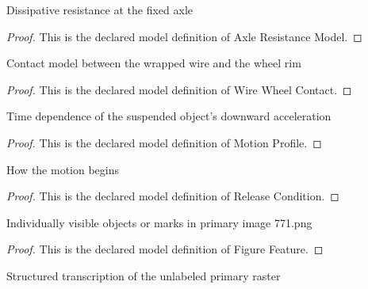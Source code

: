 \begin{definition}
  \label{def:physics:phyx-mini-0771:phyxminiproblems-problemphyxmini0771-axleresistancemodel}
  Dissipative resistance at the fixed axle
\end{definition}
\begin{proof}
  This is the declared model definition of Axle Resistance Model.
\end{proof}
\begin{definition}
  \label{def:physics:phyx-mini-0771:phyxminiproblems-problemphyxmini0771-wirewheelcontact}
  Contact model between the wrapped wire and the wheel rim
\end{definition}
\begin{proof}
  This is the declared model definition of Wire Wheel Contact.
\end{proof}
\begin{definition}
  \label{def:physics:phyx-mini-0771:phyxminiproblems-problemphyxmini0771-motionprofile}
  Time dependence of the suspended object's downward acceleration
\end{definition}
\begin{proof}
  This is the declared model definition of Motion Profile.
\end{proof}
\begin{definition}
  \label{def:physics:phyx-mini-0771:phyxminiproblems-problemphyxmini0771-releasecondition}
  How the motion begins
\end{definition}
\begin{proof}
  This is the declared model definition of Release Condition.
\end{proof}
\begin{definition}
  \label{def:physics:phyx-mini-0771:phyxminiproblems-problemphyxmini0771-figurefeature}
  Individually visible objects or marks in primary image 771.png
\end{definition}
\begin{proof}
  This is the declared model definition of Figure Feature.
\end{proof}
\begin{definition}
  \label{def:physics:phyx-mini-0771:phyxminiproblems-problemphyxmini0771-wheelandblockfigure}
  Structured transcription of the unlabeled primary raster
\end{definition}
